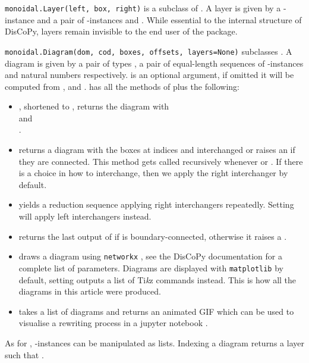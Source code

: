 \begin{class}\normalfont\texttt{monoidal.Layer(left, box, right)} is a subclass of .
A layer is given by a -instance  and a pair of -instances  and .
While essential to the internal structure of DisCoPy, layers remain invisible to the end user of the package.
\end{class}

\begin{class}\normalfont\texttt{monoidal.Diagram(dom, cod, boxes, offsets, layers=None)} subclasses .
A diagram  is given by a pair of types , a pair of equal-length sequences  of -instances and natural numbers respectively.
 is an optional argument, if omitted it will be computed from ,  and .
 has all the methods of  plus the following:
\begin{itemize}
\item {}, shortened to , returns the diagram with
\\ and
\\.
\item {} returns a diagram with the boxes at indices  and  interchanged or raises an  if they are connected.
This method gets called recursively whenever  or .
If there is a choice in how to interchange, then we apply the right interchanger by default.
\item {} yields a reduction sequence applying right interchangers repeatedly. Setting  will apply left interchangers instead.
\item {} returns the last output of  if  is boundary-connected, otherwise it raises a .
\item {} draws a diagram using \texttt{networkx} \cite{Networkx20}, see the DisCoPy documentation \cite{DeFeliceToumi} for a complete list of parameters. Diagrams are displayed with \texttt{matplotlib} \cite{Matplotlib20} by default, setting  outputs a list of Ti\textit{k}z \cite{Tantau13} commands instead. This is how all the diagrams in this article were produced.
\item {} takes a list of diagrams and returns an animated GIF which can be used to visualise a rewriting process in a jupyter notebook \cite{KluyverEtAl16}.
\end{itemize}

As for , -instances can be manipulated as lists.
Indexing a diagram  returns a layer  such that .
\end{class}


